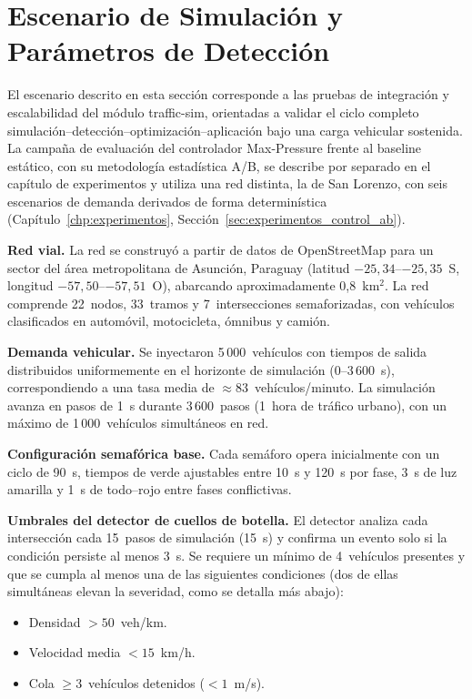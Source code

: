 \section{Escenario de Simulación y Parámetros de Detección}
\label{subsec:traffic_sim_scenario}

El escenario descrito en esta sección corresponde a las pruebas de integración y escalabilidad del módulo traffic-sim, orientadas a validar el ciclo completo simulación--detección--optimización--aplicación bajo una carga vehicular sostenida. La campaña de evaluación del controlador Max-Pressure frente al baseline estático, con su metodología estadística A/B, se describe por separado en el capítulo de experimentos y utiliza una red distinta, la de San Lorenzo, con seis escenarios de demanda derivados de forma determinística (Capítulo~\ref{chp:experimentos}, Sección~\ref{sec:experimentos_control_ab}).

\textbf{Red vial.} La red se construyó a partir de datos de OpenStreetMap para un sector del área metropolitana de Asunción, Paraguay (latitud $-25{,}34$--$-25{,}35$~S, longitud $-57{,}50$--$-57{,}51$~O), abarcando aproximadamente 0{,}8~km$^2$. La red comprende 22~nodos, 33~tramos y 7~intersecciones semaforizadas, con vehículos clasificados en automóvil, motocicleta, ómnibus y camión.

\textbf{Demanda vehicular.} Se inyectaron 5\,000~vehículos con tiempos de salida distribuidos uniformemente en el horizonte de simulación (0--3\,600~s), correspondiendo a una tasa media de $\approx 83$~vehículos/minuto. La simulación avanza en pasos de 1~s durante 3\,600~pasos (1~hora de tráfico urbano), con un máximo de 1\,000~vehículos simultáneos en red.

\textbf{Configuración semafórica base.} Cada semáforo opera inicialmente con un ciclo de 90~s, tiempos de verde ajustables entre 10~s y 120~s por fase, 3~s de luz amarilla y 1~s de todo--rojo entre fases conflictivas.

\textbf{Umbrales del detector de cuellos de botella.} El detector analiza cada intersección cada 15~pasos de simulación (15~s) y confirma un evento solo si la condición persiste al menos 3~s. Se requiere un mínimo de 4~vehículos presentes y que se cumpla al menos una de las siguientes condiciones (dos de ellas simultáneas elevan la severidad, como se detalla más abajo):

\begin{itemize}
    \item Densidad $> 50$~veh/km.
    \item Velocidad media $< 15$~km/h.
    \item Cola $\geq 3$~vehículos detenidos ($< 1$~m/s).
\end{itemize}

